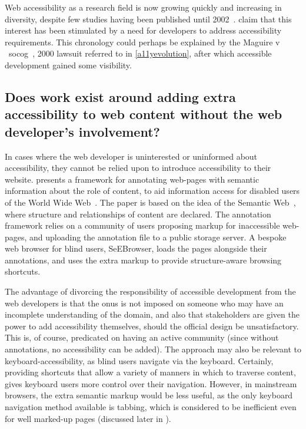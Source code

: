 \documentclass[11pt,openright,a4paper]{report}
\begin{document}
Web accessibility as a research field is now growing quickly and increasing in diversity, despite few studies having been published until 2002~\cite{freire2007techniques}. \citeauthor{freire2007techniques} claim that this interest has been stimulated by a need for developers to address accessibility requirements. This chronology could perhaps be explained by the Maguire v ~\gls{socog}~\cite{sloan2001web,russell2003access}, 2000 lawsuit referred to in \cref{a11yevolution}, after which accessible development gained some visibility.
\subsection{Does work exist around adding extra accessibility to web content without the web developer's involvement?}
\label{addingaccessibilityyourself}
In cases where the web developer is uninterested or uninformed about accessibility, they cannot be relied upon to introduce accessibility to their website. \citeauthor{kouroupetroglou2006semantic} presents a framework for annotating web-pages with semantic information about the role of content, to aid information access for disabled users of the World Wide Web~\cite{kouroupetroglou2006semantic}. The paper is based on the idea of the Semantic Web~\cite{berners2001semantic}, where structure and relationships of content are declared. The annotation framework relies on a community of users proposing markup for inaccessible web-pages, and uploading the annotation file to a public storage server. A bespoke web browser for blind users, SeEBrowser, loads the pages alongside their annotations, and uses the extra markup to provide structure-aware browsing shortcuts.

The advantage of divorcing the responsibility of accessible development from the web developers is that the onus is not imposed on someone who may have an incomplete understanding of the domain, and also that stakeholders are given the power to add accessibility themselves, should the official design be unsatisfactory. This is, of course, predicated on having an active community (since without annotations, no accessibility can be added). The approach may also be relevant to keyboard-accessibility, as blind users navigate via the keyboard. Certainly, providing shortcuts that allow a variety of manners in which to traverse content, gives keyboard users more control over their navigation. However, in mainstream browsers, the extra semantic markup would be less useful, as the only keyboard navigation method available is tabbing, which is considered to be inefficient even for well marked-up pages (discussed later in ).
\end{document}
